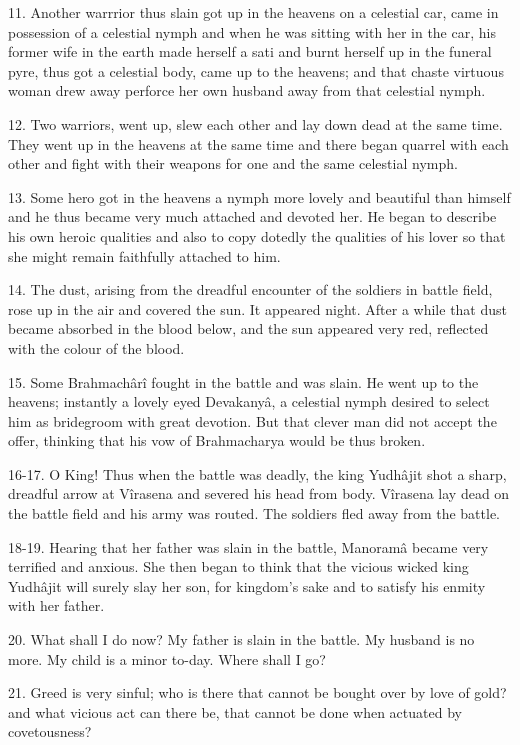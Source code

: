 11. Another warrrior thus slain got up in the heavens on a celestial car, came in possession of a celestial nymph and when he was sitting with her in the car, his former wife in the earth made herself a sati and burnt herself up in the funeral pyre, thus got a celestial body, came up to the heavens; and that chaste virtuous woman drew away perforce her own husband away from that celestial nymph.

12. Two warriors, went up, slew each other and lay down dead at the same time. They went up in the heavens at the same time and there began quarrel with each other and fight with their weapons for one and the same celestial nymph.

13. Some hero got in the heavens a nymph more lovely and beautiful than himself and he thus became very much attached and devoted her. He began to describe his own heroic qualities and also to copy dotedly the qualities of his lover so that she might remain faithfully attached to him.

14. The dust, arising from the dreadful encounter of the soldiers in battle field, rose up in the air and covered the sun. It appeared night. After a while that dust became absorbed in the blood below, and the sun appeared very red, reflected with the colour of the blood.

15. Some Brahmach\^ar\^i fought in the battle and was slain. He went up to the heavens; instantly a lovely eyed Devakany\^a, a celestial nymph desired to select him as bridegroom with great devotion. But that clever man did not accept the offer, thinking that his vow of Brahmacharya would be thus broken.

16-17. O King! Thus when the battle was deadly, the king Yudh\^ajit shot a sharp, dreadful arrow at V\^irasena and severed his head from body. V\^irasena lay dead on the battle field and his army was routed. The soldiers fled away from the battle.

18-19. Hearing that her father was slain in the battle, Manoram\^a became very terrified and anxious. She then began to think that the vicious wicked king Yudh\^ajit will surely slay her son, for kingdom's sake and to satisfy his enmity with her father.

20. What shall I do now? My father is slain in the battle. My husband is no more. My child is a minor to-day. Where shall I go?

21. Greed is very sinful; who is there that cannot be bought over by love of gold? and what vicious act can there be, that cannot be done when actuated by covetousness?

